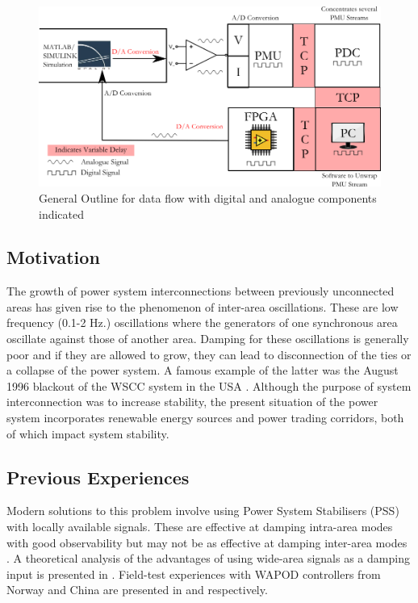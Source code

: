 \documentclass[conference]{IEEEtran}
\begin{document}
\begin{figure}[!t]
\centering
\includegraphics[width=5in]{DataFlow.png}
\caption{General Outline for data flow with digital and analogue components indicated}
\label{Data_path}
\end{figure}

\subsection{Motivation}
The growth of power system interconnections between previously unconnected areas has given rise to the phenomenon of inter-area oscillations. These are low frequency (0.1-2 Hz.) oscillations where the generators of one synchronous area oscillate against those of another area. Damping for these oscillations is generally poor and if they are allowed to grow, they can lead to disconnection of the ties or a collapse of the power system. A famous example of the latter was the August 1996 blackout of the WSCC system in the USA \cite{NAERC}. Although the purpose of system interconnection was to increase stability, the present situation of the power system incorporates renewable energy sources and power trading corridors, both of which impact system stability.\\

\subsection{Previous Experiences}
Modern solutions to this problem involve using Power System Stabilisers (PSS) with locally available signals. These are effective at damping intra-area modes with good observability but may not be as effective at damping inter-area modes \cite{Dmello} \cite{localREMcomparison}. A theoretical analysis of the advantages of using wide-area signals as a damping input is presented in \cite{Yuwa}. Field-test experiences with WAPOD controllers from Norway and China are presented in \cite{WAPODNorway} and \cite{WAPODChina} respectively.
\end{document}
